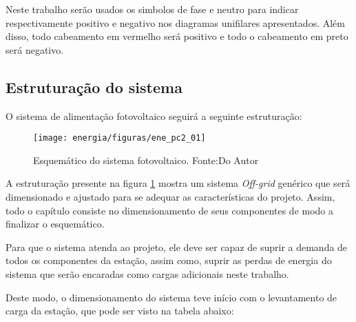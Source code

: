 Neste trabalho serão usados os simbolos de fase e neutro para indicar respectivamente positivo e negativo nos diagramas unifilares apresentados. Além disso, todo cabeamento em vermelho será positivo e todo o cabeamento em preto será negativo. 

\subsection{Estruturação do sistema}

O sistema de alimentação fotovoltaico seguirá a seguinte estruturação:

\begin{figure}[H]
		\centering
		\texttt{[image: energia/figuras/ene\_pc2\_01]}
		\caption{Esquemático do sistema fotovoltaico. Fonte:Do Autor}
		\label{ene_pc2_01}
\end{figure}

A estruturação presente na figura \ref{ene_pc2_01} mostra um sistema \textit{Off-grid} genérico que será dimensionado e ajustado para se adequar as características do projeto. Assim, todo o capítulo consiste no dimensionamento de seus componentes de modo a finalizar o esquemático.

Para que o sistema atenda ao projeto, ele deve ser capaz de suprir a demanda de todos os componentes da estação, assim como, suprir as perdas de energia do sistema que serão encaradas como cargas adicionais neste trabalho. 

Deste modo, o dimensionamento do sistema teve início com o levantamento de carga da estação, que pode ser visto na tabela abaixo:

